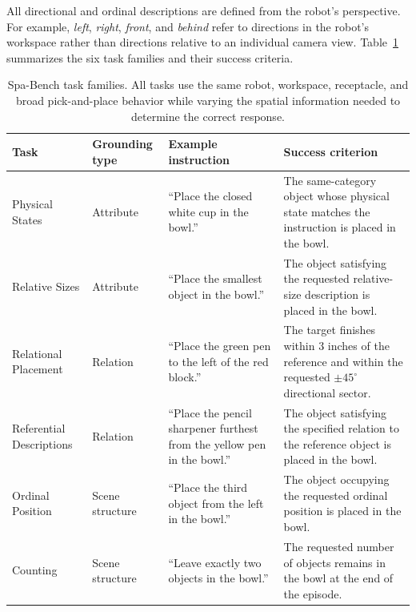 \documentclass[conference]{IEEEtran}
\begin{document}
All directional and ordinal descriptions are defined from the robot's perspective. For example, \emph{left}, \emph{right}, \emph{front}, and \emph{behind} refer to directions in the robot's workspace rather than directions relative to an individual camera view. Table~\ref{tab:task_overview} summarizes the six task families and their success criteria.

\begin{table}[t]
\caption{Spa-Bench task families. All tasks use the same robot, workspace, receptacle, and broad pick-and-place behavior while varying the spatial information needed to determine the correct response.}
\label{tab:task_overview}
\centering
\footnotesize
\renewcommand{\arraystretch}{1.08}
\begin{tabular}{p{2.6cm}p{2.5cm}p{5.3cm}p{5.8cm}}
\toprule
\textbf{Task} &
\textbf{Grounding type} &
\textbf{Example instruction} &
\textbf{Success criterion} \\
\midrule

Physical States &
Attribute &
``Place the closed white cup in the bowl.'' &
The same-category object whose physical state matches the instruction is placed in the bowl. \\

Relative Sizes &
Attribute &
``Place the smallest object in the bowl.'' &
The object satisfying the requested relative-size description is placed in the bowl. \\

Relational Placement &
Relation &
``Place the green pen to the left of the red block.'' &
The target finishes within 3 inches of the reference and within the requested $\pm45^{\circ}$ directional sector. \\

Referential Descriptions &
Relation &
``Place the pencil sharpener furthest from the yellow pen in the bowl.'' &
The object satisfying the specified relation to the reference object is placed in the bowl. \\

Ordinal Position &
Scene structure &
``Place the third object from the left in the bowl.'' &
The object occupying the requested ordinal position is placed in the bowl. \\

Counting &
Scene structure &
``Leave exactly two objects in the bowl.'' &
The requested number of objects remains in the bowl at the end of the episode. \\

\bottomrule
\end{tabular}
\end{table}
\end{document}
